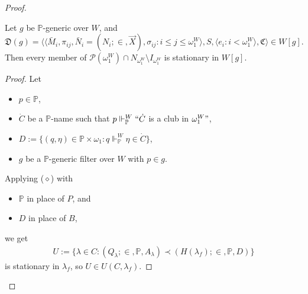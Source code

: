 \documentclass[12pt]{article}
\numberwithin{equation}{section}
\begin{document}
\begin{proof}
\begin{lem}\label{lem453}
Let $g$ be $\mathbb{P}$-generic over $W$, and
\begin{equation*}
    \mathfrak{D}(g) = \langle \langle \bar{M}_i, \pi_{ij},  \bar{N}_i = (N_i; \in, \Vec{X}), \sigma_{ij} : i \leq j \leq \omega_1^W \rangle, S, \langle e_i : i < \omega_1^W \rangle, \mathfrak{C} \rangle \in W[g] \text{.}
\end{equation*}
Then every member of $\mathcal{P}(\omega_1^W) \cap N_{\omega_1^W} \setminus I_{\omega_1^W}$ is stationary in $W[g]$.
\end{lem}

\begin{proof}
Let 
\begin{itemize}
    \item $p \in \mathbb{P}$,
    \item $\dot{C}$ be a $\mathbb{P}$-name such that $p \Vdash^W_{\mathbb{P}} ``\dot{C}$ is a club in $\omega_1^W"$,
    \item $D := \{(q, \eta) \in \mathbb{P} \times \omega_1 : q \Vdash^W_{\mathbb{P}} \eta \in \dot{C}\}$,
    \item $g$ be a $\mathbb{P}$-generic filter over $W$ with $p \in g$.
\end{itemize}
Applying ($\diamond$) with 
\begin{itemize}
    \item $\mathbb{P}$ in place of $P$, and
    \item $D$ in place of $B$,
\end{itemize}
we get
\begin{align*}
    U := \{\lambda \in C : (Q_{\lambda}; \in, \mathbb{P}, A_{\lambda}) \prec (H(\lambda_f); \in, \mathbb{P}, D)\}
\end{align*}
is stationary in $\lambda_f$, so $U \in U(C, \lambda_f)$.


\end{proof}
\end{proof}
\end{document}
